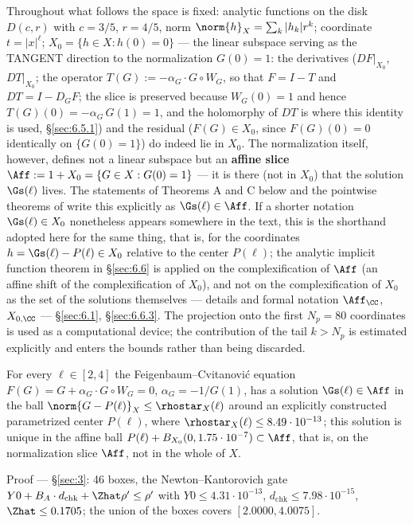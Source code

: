Throughout what follows the space is fixed: analytic functions on the disk
$D(c, r)$ with $c = 3/5$, $r = 4/5$, norm $\norm{h}_X = \sum_k |h_k| r^k$; coordinate
$t = |x|^\ell$; $X_{0} = \{h \in X : h(0) = 0\}$ --- the linear subspace serving as the TANGENT
direction to the normalization $G(0) = 1$: the derivatives ($DF|_{X_{0}}$, $DT|_{X_{0}}$; the
operator $T(G) := -\alpha_G \cdot G \circ W_G$, so that $F = I - T$ and
$DT = I - D_G F$; the slice is preserved because $W_G(0) = 1$ and hence
$T(G)(0) = -\alpha_G\, G(1) = 1$, and the holomorphy of $DT$ is where this identity is
used, \S\ref{sec:6.5.1})
and the residual ($F(G) \in X_{0}$, since $F(G)(0) = 0$ identically on $\{G(0)=1\}$) do
indeed lie in $X_{0}$. The normalization itself, however, defines not a linear subspace
but an \textbf{affine slice} $\Aff := 1 + X_{0} = \{G \in X : G(0) = 1\}$ --- it is there (not in
$X_{0}$) that the solution $\Gs(\ell)$ lives. The statements of Theorems A and C below and
the pointwise theorems of  write this explicitly as $\Gs(\ell) \in \Aff$. If a shorter
notation $\Gs(\ell) \in X_{0}$ nonetheless appears somewhere in the text, this is the
shorthand adopted here for the same thing, that is, for the coordinates
$h = \Gs(\ell) - P(\ell) \in X_{0}$ relative to the center $P(\ell)$; the analytic implicit
function theorem in \S\ref{sec:6.6} is applied on the complexification of $\Aff$ (an affine shift of
the complexification of $X_{0}$), and not on the complexification of $X_{0}$ as the set of
the solutions themselves --- details and formal notation $\Aff_{\CC}$, $X_{0,\CC}$ --- \S\ref{sec:6.1}, \S\ref{sec:6.6.3}.
The projection onto the first $N_{p} = 80$ coordinates is used as a computational
device; the contribution of the tail $k > N_{p}$ is estimated explicitly and enters
the bounds rather than being discarded.

\begin{namedtheorem}
For every $\ell \in [2, 4]$ the Feigenbaum--Cvitanović equation
$F(G) = G + \alpha_G \cdot G \circ W_G = 0$, $\alpha_G = -1/G(1)$, has a solution
$\Gs(\ell) \in \Aff$ in the ball $\norm{G - P(\ell)}_X \le \rhostar_X(\ell)$ around an explicitly constructed
parametrized center $P(\ell)$, where $\rhostar_X(\ell) \le 8.49\cdot 10^{-13}$; this solution is
unique in the affine ball $P(\ell) + B_{X_{0}}(0, 1.75\cdot 10^{-7}) \subset \Aff$, that is,
on the normalization slice $\Aff$, not in the whole of $X$.
\end{namedtheorem}

Proof --- \S\ref{sec:3}: 46 boxes, the Newton--Kantorovich gate \cite{kantorovich1948newton}
$Y0 + B_A \cdot d_{\mathrm{chk}} + \Zhat \rho' \le \rho'$ with $Y0 \le 4.31\cdot 10^{-13}$, $d_{\mathrm{chk}} \le 7.98\cdot 10^{-15}$,
$\Zhat \le 0.1705$; the union of the boxes covers $[2.0000, 4.0075]$.

